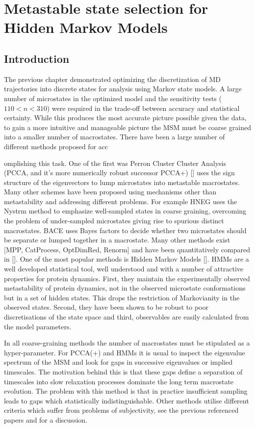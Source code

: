 \let\textcircled=\pgftextcircled
\chapter{Metastable state selection for Hidden Markov Models}
\label{chap:hmm}

\section{Introduction}
The previous chapter demonstrated optimizing the discretization of MD trajectories into discrete states for analysis using Markov state models. A large number of microstates in the optimized model and the sensitivity tests ($110 < n < 310$) were required in the trade-off between accuracy and statistical certainty. While this produces the most accurate picture possible given the data, to gain a more intuitive and manageable picture the MSM must be coarse grained into a smaller number of macrostates. There have been a large number of different methods proposed for acc

omplishing this task. One of the first was Perron Cluster Cluster Analysis (PCCA, and it's more numerically robust successor PCCA+)  []  uses the sign structure of the eigenvectors to lump microstates into metastable macrostates. Many other schemes have been proposed using mechanisms other than metastability and addressing different problems. For example HNEG uses the Nystrm method to emphasize well-sampled states in coarse graining, overcoming the problem of under-sampled microstates giving rise to spurious distinct macrostates.  BACE uses Bayes factors to decide whether two microstates should be separate or lumped together in a macrostate. Many other methods exist [MPP, CatProcess, OptDimRed, Renorm] and have been quantitatively compared in []. One of the most popular methods is Hidden Markov Models []. HMMs are a well developed statistical tool, well understood and with a number of attractive properties for protein dynamics. First, they maintain the experimentally observed metastability of protein dynamics, not in the observed microstate conformations but in a set of hidden states. This drops the restriction of Markovianity in the observed states. Second, they have been shown to be robust to poor discretisations of the state space and third, observables are easily calculated from the model parameters. 

In all coarse-graining methods the number of macrostates must be stipulated as a hyper-parameter. For PCCA(+) and HMMs it is usual to inspect the eigenvalue spectrum of the MSM and look for gaps in successive eigenvalues or implied timescales. The motivation behind this is that these gaps define a separation of timescales into slow relaxation processes dominate the long term macrostate evolution. The problem with this method is that in practice insufficient sampling leads to gaps which statistically indistinguishable.  Other methods utilise different criteria which suffer from problems of subjectivity,  see the previous referenced papers and \cite{bowmanQuantitativeComparisonAlternative2013} for a discussion.  

